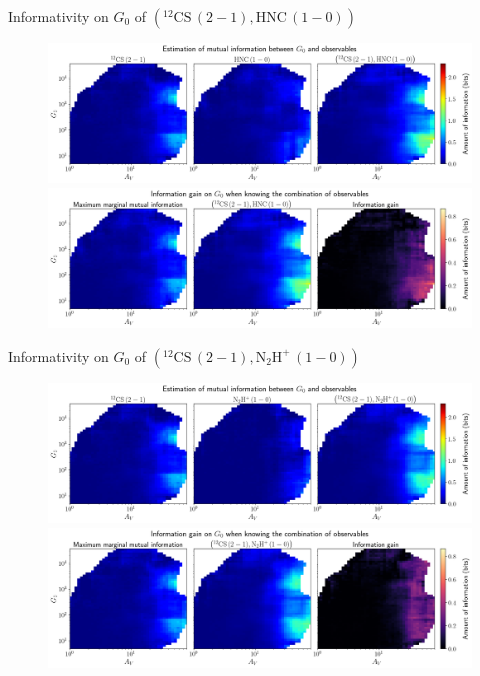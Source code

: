 \documentclass{beamer}
\begin{document}
\begin{frame}{Informativity on $G_0$ of $\left(\mathrm{^{12}CS\,(2-1)},\mathrm{HNC\,(1-0)}\right)$}
    \begin{figure}
        \centering
        \includegraphics[width=0.95\linewidth]{../mi/g0__12cs21_hnc10_mi.png}
        \vfill
        \includegraphics[width=0.95\linewidth]{../mi/g0__12cs21_hnc10_mi_gain.png}
    \end{figure}
\end{frame}

\begin{frame}{Informativity on $G_0$ of $\left(\mathrm{^{12}CS\,(2-1)},\mathrm{N_2H^+\,(1-0)}\right)$}
    \begin{figure}
        \centering
        \includegraphics[width=0.95\linewidth]{../mi/g0__12cs21_n2hp10_mi.png}
        \vfill
        \includegraphics[width=0.95\linewidth]{../mi/g0__12cs21_n2hp10_mi_gain.png}
    \end{figure}
\end{frame}
\end{document}
